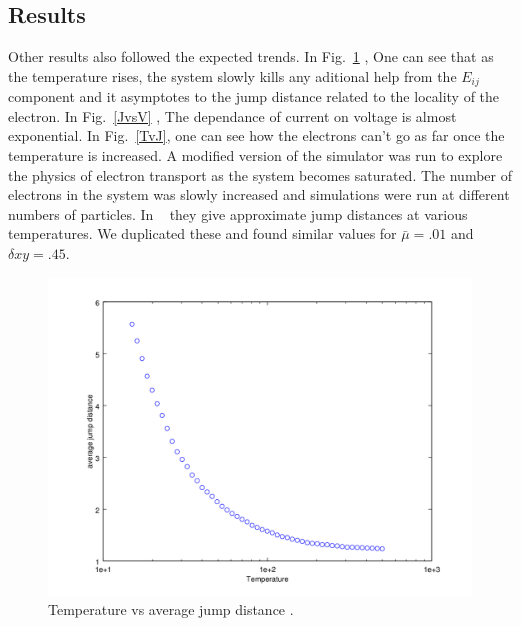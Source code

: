 \subsection{Results}
  Other results also followed the expected trends. In Fig.~\ref{TvsRbar} , One can see that as the temperature rises, the system slowly kills any aditional help from the $E_{ij}$ component and it asymptotes to the jump distance related to the locality of the electron. In Fig.~\ref{JvsV} , The dependance of current on voltage is almost exponential. In Fig.~\ref{TvJ}, one can see how the electrons can't go as far once the temperature is increased. A modified version of the simulator was run to explore the physics of electron transport as the system becomes saturated. The number of electrons in the system was slowly increased and simulations were run at different numbers of particles. In ~\cite{Beloborodov07} they give approximate jump distances at various temperatures. We duplicated these and found similar values for $\bar \mu = .01$ and $\delta xy = .45$.

\begin{figure}[htbp]
\begin{center}
\includegraphics[scale=.50]{TvRGreat.png}
\caption{Temperature vs average jump distance .}
\label{TvsRbar}
\end{center}
\end{figure}

